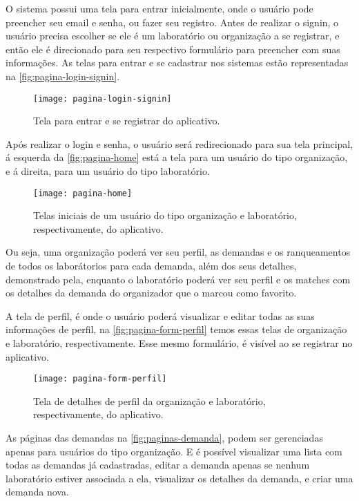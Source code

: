 O sistema possui uma tela para entrar inicialmente, onde o usuário pode preencher seu email e senha, ou fazer seu registro. Antes de realizar o signin, o usuário precisa escolher se ele é um laboratório ou organização a se registrar, e então ele é direcionado para seu respectivo formulário para preencher com suas informações. As telas para entrar e se cadastrar nos sistemas estão representadas na \autoref{fig:pagina-login-signin}.

\begin{figure}[htb]
  \captionsetup{width=0.43\textwidth}
  \caption{Tela para entrar e se registrar do aplicativo.}
  \label{fig:pagina-login-signin}
  \texttt{[image: pagina-login-signin]}
  \fonte{}
\end{figure}

Após realizar o login e senha, o usuário será redirecionado para sua tela principal, á esquerda da \autoref{fig:pagina-home} está a tela para um usuário do tipo organização, e á direita, para um usuário do tipo laboratório.

\begin{figure}[htb]
  \captionsetup{width=0.43\textwidth}
  \caption{Telas iniciais de um usuário do tipo organização e laboratório, respectivamente, do aplicativo.}
  \label{fig:pagina-home}
  \texttt{[image: pagina-home]}
  \fonte{}
\end{figure}

Ou seja, uma organização poderá ver seu perfil, as demandas e os ranqueamentos de todos os laborátorios para cada demanda, além dos seus detalhes, demonstrado pela, enquanto o laboratório poderá ver seu perfil e os matches com os detalhes da demanda do organizador que o marcou como favorito.

A tela de perfil, é onde o usuário poderá visualizar e editar todas as suas informações de perfil, na \autoref{fig:pagina-form-perfil} temos essas telas de organização e laboratório, respectivamente. Esse mesmo formulário, é visível ao se registrar no aplicativo.

\begin{figure}[htb]
  \captionsetup{width=0.43\textwidth}
  \caption{Tela de detalhes de perfil da organização e laboratório, respectivamente, do aplicativo.}
  \label{fig:pagina-form-perfil}
  \texttt{[image: pagina-form-perfil]}
  \fonte{}
\end{figure}

As páginas das demandas na \autoref{fig:paginas-demanda}, podem ser gerenciadas apenas para usuários do tipo organização. E é possível visualizar uma lista com todas as demandas já cadastradas, editar a demanda apenas se nenhum laboratório estiver associada a ela, visualizar os detalhes da demanda, e criar uma demanda nova.

